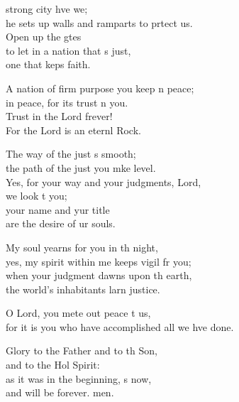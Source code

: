\settowidth{\versewidth}{for it is you who have accomplished all we have done.}
\begin{psalmverse}%
  \begin{patverse}
 strong city hve we;\Med\\
he sets up walls and ramparts to prtect us.\\
Open up the gtes\Flex\\
to let in a nation that \pointup{\i}s just,\Med\\
one that keps faith.

A nation of firm purpose you keep \pointup{\i}n peace;\Med\\
in peace, for its trust \pointup{\i}n you.\\
Trust in the Lord frever!\Med\\
For the Lord is an eternl Rock.

The way of the just \pointup{\i}s smooth;\Med\\
the path of the just you mke level.\\
Yes, for your way and your judgments,  Lord,\Med\\
we look t you;\\
your name and yur title\Med\\
are the desire of ur souls.

My soul yearns for you in th night,\Med\\
yes, my spirit within me keeps vigil fr you;\\
when your judgment dawns upon th earth,\Med\\
the world’s inhabitants larn justice.

O Lord, you mete out peace t us,\Med\\
for it is you who have accomplished all we hve done.

Glory to the Father and to th Son,\Med\\
and to the Hol Spirit:\\
as it was in the beginning, \pointup{\i}s now,\Med\\
and will be forever. men.
  \end{patverse}
\end{psalmverse}
